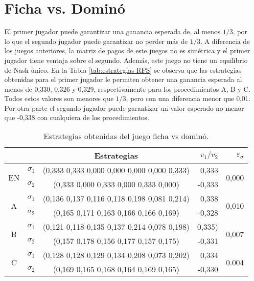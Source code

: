 \section*{Ficha vs. Dominó}

El primer jugador puede garantizar una ganancia esperada de, al menos $1/3$, por lo que el segundo jugador puede garantizar no perder más de $1/3$. A diferencia de los juegos anteriores, la matriz de pagos de este juegos no es simétrica y el primer jugador tiene ventaja sobre el segundo. Además, este juego no tiene un equilibrio de Nash único. En la Tabla \ref{tab:estrategias-RPS} se observa que las estrategias obtenidas para el primer jugador le permiten obtener una ganancia esperada al menos de 0,330, 0,326 y 0,329, respectivamente para los procedimientos A, B y C. Todos estos valores son menores que $1/3$, pero con una diferencia menor que 0,01. Por otra parte el segundo jugador puede garantizar un valor esperado no menor que -0,338 con cualquiera de los procedimientos.

\begin{table}[h]
    \centering
    \caption{Estrategias obtenidas del juego ficha vs dominó.}
    \label{tab:estrategias-domino}
    \begin{tabular}{c c c r r}
        \toprule
        & & Estrategias & $v_1 / v_2$ & $\varepsilon_{\sigma}$ \\
        \midrule
        \multirow{2}{*}{EN}
        & $\sigma_1$ & (0,333 0,333 0,000 0,000 0,000 0,000 0,333) & 0,333 & \multirow{2}{*}{0,000}\\
        & $\sigma_2$ & (0,333 0,000 0,333 0,000 0,333 0,000) &  -0,333 & \\
        \midrule
        \multirow{2}{*}{A}
        & $\sigma_1$ & (0,136 0,137 0,116 0,118 0,198 0,081 0,214) & 0,338 &\multirow{2}{*}{0,010} \\
        & $\sigma_2$ & (0,165 0,171 0,163 0,166 0,166 0,169) & -0,328 &\\
        \midrule
        \multirow{2}{*}{B}
        & $\sigma_1$ & (0,121 0,118 0,135 0,137 0,214 0,078 0,198) & 0,335) & \multirow{2}{*}{0,007} \\
        & $\sigma_2$ & (0,157 0,178 0,156 0,177 0,157 0,175) & -0,331 & \\
        \midrule
        \multirow{2}{*}{C}
        & $\sigma_1$ & (0,128 0,128 0,129 0,134 0,208 0,073 0,202) & 0,334 & \multirow{2}{*}{0.004} \\
        & $\sigma_2$ & (0,169 0,165 0,168 0,164 0,169 0,165) & -0,330 & \\
        \bottomrule
    \end{tabular}
\end{table}

